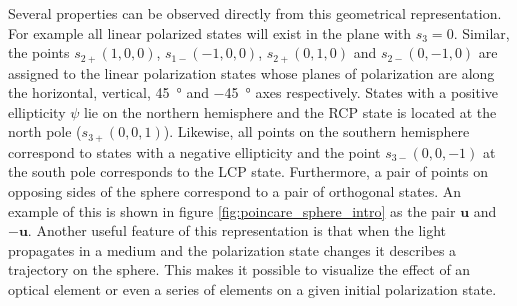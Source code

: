 Several properties can be observed directly from this geometrical representation. For example all linear polarized states will exist in the plane with $s_3=0$. Similar, the points $s_{2+}(1,0,0)$, $s_{1-}(-1,0,0)$, $s_{2+}(0,1,0)$ and $s_{2-}(0,-1,0)$ are assigned to the linear polarization states whose planes of polarization are along the horizontal, vertical, \SI{+45}{\degree} and \SI{-45}{\degree} axes respectively. States with a positive ellipticity $\psi$ lie on the northern hemisphere and the RCP state is located at the north pole ($s_{3+}(0,0,1)$). Likewise, all points on the southern hemisphere correspond to states with a negative ellipticity and the point $s_{3-}(0,0,-1)$ at the south pole corresponds to the LCP state. Furthermore, a pair of points on opposing sides of the sphere correspond to a pair of orthogonal states. An example of this is shown in figure \ref{fig:poincare_sphere_intro} as the pair $\bm{u}$ and $-\bm{u}$. Another useful feature of this representation is that when the light propagates in a medium and the polarization state changes it describes a trajectory on the sphere. This makes it possible to visualize the effect of an optical element or even a series of elements on a given initial polarization state.

